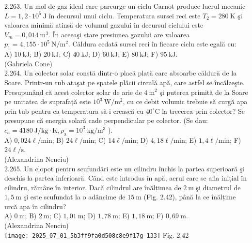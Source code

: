2.263. Un mol de gaz ideal care parcurge un ciclu Carnot produce lucrul mecanic $L=1,2 \cdot 10^{5} \mathrm{~J}$ în decursul unui ciclu. Temperatura sursei reci este $T_{2}=280 \mathrm{~K}$ şi valoarea minimă atinsă de volumul gazului în decursul ciclului este $V_{m}=0,014 \mathrm{~m}^{3}$. În aceeaşi stare presiunea gazului are valoarea $p_{1}=4,155 \cdot 10^{5} \mathrm{~N} / \mathrm{m}^{2}$. Căldura cedată sursei reci în fiecare ciclu este egală cu:\\ A) $10 \mathrm{~kJ}$; B) $20 \mathrm{~kJ}$; C) $40 \mathrm{~kJ}$; D) $60 \mathrm{~kJ}$; E) $80 \mathrm{~kJ}$; F) $95 \mathrm{~kJ}$.\\ (Gabriela Cone)\\

2.264. Un colector solar constă dintr-o placă plată care absoarbe căldură de la Soare. Printr-un tub ataşat pe spatele plăcii circulǎ apă, care astfel se încălzeşte. Presupunând că acest colector solar de arie de $4 \mathrm{~m}^{2}$ şi puterea primită de la Soare pe unitatea de suprafață este $10^{3} \mathrm{~W} / \mathrm{m}^{2}$, cu ce debit volumic trebuie să curgă apa prin tub pentru ca temperatura să-i crească cu $40^{\circ} \mathrm{C}$ la trecerea prin colector? Se presupune că energia solară cade perpendicular pe colector. (Se dau: $c_{a}=4180 \mathrm{~J} / \mathrm{kg} \cdot \mathrm{K}, \rho_{\mathrm{a}}=10^{3} \mathrm{~kg} / \mathrm{m}^{3}$ ).\\ A) $0,024 \ell / \mathrm{min}$; B) $24 \ell / \mathrm{min}$; C) $14 \ell / \mathrm{min}$; D) $4,18 \ell / \mathrm{min}$; E) $1,4 \ell / \mathrm{min}$; F) $24 \ell / \mathrm{s}$.\\ (Alexandrina Nenciu)\\

2.265. Un clopot pentru scufundări este un cilindru închis la partea superioară şi deschis la partea inferioară. Când este introdus în apă, aerul care se afla inițial în cilindru, rămâne în interior. Dacă cilindrul are înălțimea de $2 \mathrm{~m}$ şi diametrul de $1,5 \mathrm{~m}$ şi este scufundat la o adâncime de $15 \mathrm{~m}$ (Fig. 2.42), până la ce înălțime urcă apa în cilindru?\\ A) $0 \mathrm{~m}$; B) $2 \mathrm{~m}$; C) $1,01 \mathrm{~m}$; D) $1,78 \mathrm{~m}$; E) $1,18 \mathrm{~m}$; F) $0,69 \mathrm{~m}$.\\ (Alexandrina Nenciu)\\ \texttt{[image: 2025\_07\_01\_5b3ff9fa0d508c8e9f17g-133]} Fig. 2.42\\

